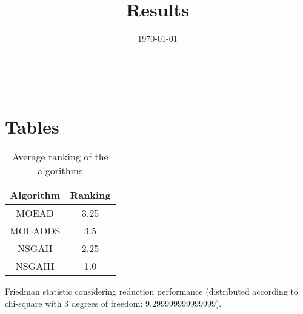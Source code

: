 \documentclass{article}
\title{Results}
\author{}
\date{\today}
\begin{document}
\oddsidemargin 0in \topmargin 0in\maketitle
\
\section{Tables}
\begin{table}[!htp]
\centering
\caption{Average ranking of the algorithms}
\begin{tabular}{c|c}
Algorithm&Ranking\\
\hline
MOEAD&3.25\\
MOEADDS&3.5\\
NSGAII&2.25\\
NSGAIII&1.0\\
\end{tabular}
\end{table}


Friedman statistic considering reduction performance (distributed according to chi-square with 3 degrees of freedom: 9.299999999999999).
\end{document}
